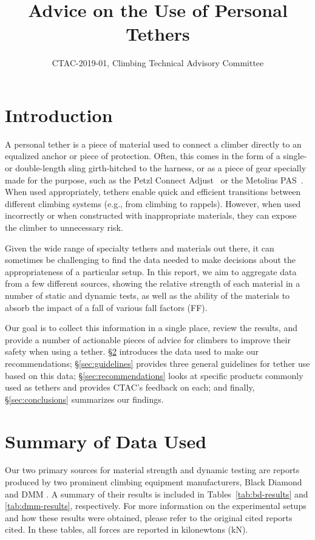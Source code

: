 \documentclass[nonacm,acmtog]{acmart}
\title{Advice on the Use of Personal Tethers}
\subtitle{CTAC-2019-01, Climbing Technical Advisory Committee}
\begin{document}
\maketitle

\section{Introduction}
\label{sec:intro}

   A personal tether is a piece of material used to connect a climber directly
   to an equalized anchor or piece of protection.  Often, this comes in the form
   of a single- or double-length sling girth-hitched to the harness, or as a
   piece of gear specially made for the purpose, such as the Petzl Connect
   Adjust~\cite{gear:connect} or the Metolius PAS~\cite{gear:pas}.  When used
   appropriately, tethers enable quick and efficient transitions between
   different climbing systems (e.g., from climbing to rappels).  However, when
   used incorrectly or when constructed with inappropriate materials, they can
   expose the climber to unnecessary risk.

   Given the wide range of specialty tethers and materials out there, it can
   sometimes be challenging to find the data needed to make decisions about the
   appropriateness of a particular setup.  In this report, we aim to aggregate
   data from a few different sources, showing the relative strength of each
   material in a number of static and dynamic tests, as well as the ability of
   the materials to absorb the impact of a fall of various fall factors (FF).

   Our goal is to collect this information in a single place, review the
   results, and provide a number of actionable pieces of advice for climbers to
   improve their safety when using a tether.  \S\ref{sec:studies} introduces
   the data used to make our recommendations; \S\ref{sec:guidelines} provides
   three general guidelines for tether use based on this data;
   \S\ref{sec:recommendations} looks at specific products commonly used as
   tethers and provides CTAC's feedback on each; and finally,
   \S\ref{sec:conclusions} summarizes our findings.

\section{Summary of Data Used}
\label{sec:studies}

   Our two primary sources for material strength and dynamic testing are
   reports produced by two prominent climbing equipment manufacturers, Black
   Diamond \cite{bd-pull-tests} and DMM \cite{dmm-pull-tests}.  A summary of
   their results is included in Tables~\ref{tab:bd-results} and
   \ref{tab:dmm-results}, respectively.  For more information on the
   experimental setups and how these results were obtained, please refer to the
   original cited reports cited.  In these tables, all forces are reported in
   kilonewtons (kN).
\end{document}

